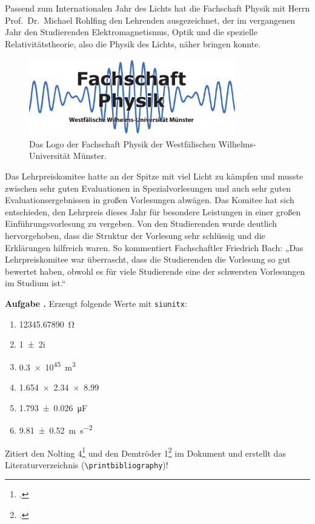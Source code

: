 \documentclass[a4paper, 12pt, headsepline, pagesize, parskip=half-, headlines=3.1]{scrartcl}
\newcounter{aufgabe}
\newenvironment{aufgabe}[1][]{\stepcounter{aufgabe}
\noindent\textbf{Aufgabe \arabic{aufgabe}.} #1\par
\begin{enumerate}[label=\alph*)]}{\end{enumerate}\bigskip}
\newenvironment{aufgabe*}[1][]{\stepcounter{aufgabe}
\noindent\textbf{Aufgabe \arabic{aufgabe}.} #1}{\bigskip}
\begin{document}
Passend zum Internationalen Jahr des Lichts hat die Fachschaft Physik mit Herrn Prof.\ Dr.\ Michael Rohlfing den Lehrenden ausgezeichnet, der im vergangenen Jahr den Studierenden Elektromagnetismus, Optik und die spezielle Relativitätstheorie, also die Physik des Lichts, näher bringen konnte.

\begin{figure}
	\centering
	\includegraphics[width=9cm]{res/logo.pdf}
	\caption{Das Logo der Fachschaft Physik der Westfälischen Wilhelms-Universität Münster.}
\end{figure}
Das Lehrpreiskomitee hatte an der Spitze mit viel Licht zu kämpfen und musste zwischen sehr guten Evaluationen in Spezialvorlesungen und auch sehr guten Evaluationsergebnissen in großen Vorlesungen abwägen. Das Komitee hat sich entschieden, den Lehrpreis dieses Jahr für besondere Leistungen in einer großen Einführungsvorlesung zu vergeben. Von den Studierenden wurde deutlich hervorgehoben, dass die Struktur der Vorlesung sehr schlüssig und die Erklärungen hilfreich waren. So kommentiert Fachschaftler Friedrich Bach: „Das Lehrpreiskomitee war überrascht, dass die Studierenden die Vorlesung so gut bewertet haben, obwohl es für viele Studierende eine der schwersten Vorlesungen im Studium ist.“

\begin{aufgabe}[Erzeugt folgende Werte mit \texttt{siunitx}:]
	\item \SI{12345,67890}{\ohm}
	\item \num{1 +- 2i}
	\item \SI{.3e45}{\m\cubed}
	\item \num{1.654 x 2.34 x 8,99}
	\item \SI{1,793 +- 0,026}{\micro\F}
	\item \SI{9,81+-0,52}{\m\per\s\squared}
	\DeactivateWarningFilters
\end{aufgabe}

\begin{aufgabe*}
	Zitiert den Nolting 4\footcite{nolting4} und den Demtröder 1\footcite{demtröder1} im Dokument und erstellt das Literaturverzeichnis (\lstinline!\printbibliography!)!
\end{aufgabe*}
\end{document}
